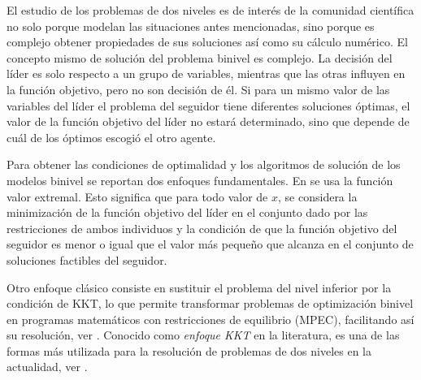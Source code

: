 El estudio de los problemas de dos niveles es de interés de la comunidad científica no solo porque modelan las situaciones antes mencionadas, sino porque es complejo obtener propiedades de sus soluciones así como su cálculo numérico.
El concepto mismo de solución del problema binivel es complejo. La decisión del líder es solo respecto a un grupo de variables, mientras que las otras influyen en la función objetivo, pero no son decisión de él. Si para un mismo valor de las variables del líder el problema del seguidor tiene diferentes soluciones óptimas, el valor de la función objetivo del líder no estará determinado, sino que depende de cuál de los óptimos escogió el otro agente. 

Para obtener las condiciones de optimalidad y los algoritmos de solución de los modelos binivel se reportan dos enfoques fundamentales. En \cite{DempeyZemkoho2020} se usa la función valor extremal. 
Esto significa que para todo valor de $x$, se considera la minimización de la función objetivo del líder en el conjunto dado por las restricciones de ambos individuos y la condición de que la función objetivo del seguidor es menor o igual que el valor más pequeño que alcanza en el conjunto de soluciones factibles del seguidor.
 
Otro enfoque clásico consiste en sustituir el problema del nivel inferior por la condición de KKT, lo que permite transformar problemas de optimización binivel en programas matemáticos con restricciones de equilibrio (MPEC), facilitando así su resolución, ver \cite{AnnotatedBibliographyDempe,Caselli2024BilevelOW,DempeyZemkoho2020}.
Conocido como \textit{enfoque KKT} en la literatura, es una de las formas más utilizada para la resolución de problemas de dos niveles en la actualidad, ver \cite{Aussel2021GenericityAO}.


